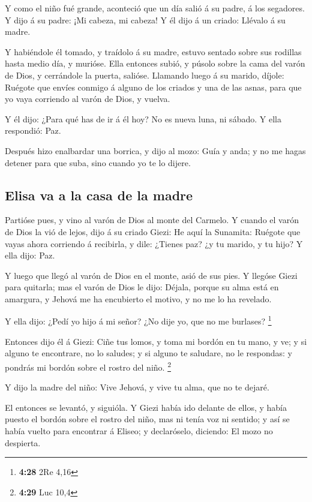  Y como el niño fué grande, aconteció que un día salió á
su padre, á los segadores.  Y dijo á su padre: ¡Mi
cabeza, mi cabeza! Y él dijo á un criado: Llévalo á su madre.

 Y habiéndole él tomado, y traídolo á su madre, estuvo
sentado sobre sus rodillas hasta medio día, y murióse. 
Ella entonces subió, y púsolo sobre la cama del varón de Dios, y
cerrándole la puerta, salióse.  Llamando luego á su
marido, díjole: Ruégote que envíes conmigo á alguno de los criados y una
de las asnas, para que yo vaya corriendo al varón de Dios, y vuelva.

 Y él dijo: ¿Para qué has de ir á él hoy? No es nueva
luna, ni sábado. Y ella respondió: Paz.

 Después hizo enalbardar una borrica, y dijo al mozo:
Guía y anda; y no me hagas detener para que suba, sino cuando yo te lo
dijere.

\hypertarget{elisa-va-a-la-casa-de-la-madre}{%
\subsection{Elisa va a la casa de la
madre}\label{elisa-va-a-la-casa-de-la-madre}}

 Partióse pues, y vino al varón de Dios al monte del
Carmelo. Y cuando el varón de Dios la vió de lejos, dijo á su criado
Giezi: He aquí la Sunamita:  Ruégote que vayas ahora
corriendo á recibirla, y dile: ¿Tienes paz? ¿y tu marido, y tu hijo? Y
ella dijo: Paz.

 Y luego que llegó al varón de Dios en el monte, asió de
sus pies. Y llegóse Giezi para quitarla; mas el varón de Dios le dijo:
Déjala, porque su alma está en amargura, y Jehová me ha encubierto el
motivo, y no me lo ha revelado.

 Y ella dijo: ¿Pedí yo hijo á mi señor? ¿No dije yo, que
no me burlases? \footnote{\textbf{4:28} 2Re 4,16}

 Entonces dijo él á Giezi: Ciñe tus lomos, y toma mi
bordón en tu mano, y ve; y si alguno te encontrare, no lo saludes; y si
alguno te saludare, no le respondas: y pondrás mi bordón sobre el rostro
del niño. \footnote{\textbf{4:29} Luc 10,4}

 Y dijo la madre del niño: Vive Jehová, y vive tu alma,
que no te dejaré.

 El entonces se levantó, y siguióla. Y Giezi había ido
delante de ellos, y había puesto el bordón sobre el rostro del niño, mas
ni tenía voz ni sentido; y así se había vuelto para encontrar á Eliseo;
y declaróselo, diciendo: El mozo no despierta.

